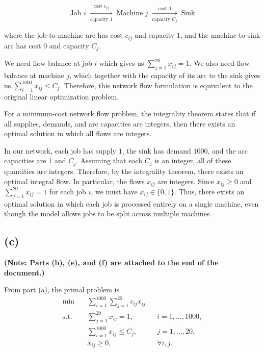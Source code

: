 \documentclass{article}
\begin{document}
\[
\boxed{\text{Job } i}
\;\xrightarrow[\text{capacity }1]{\text{cost }c_{ij}}\;
\boxed{\text{Machine } j}
\;\xrightarrow[\text{capacity }C_j]{\text{cost }0}\;
\boxed{\text{Sink}}
\]

where the job-to-machine arc has cost \(c_{ij}\) and capacity \(1\), and
the machine-to-sink arc has cost \(0\) and capacity \(C_j\).

We need flow balance at job \(i\) which gives us 
$
\sum_{j=1}^{20} x_{ij} = 1.
$
We also need flow balance at machine \(j\), which together with the capacity of its arc to
the sink gives us $
\sum_{i=1}^{1000} x_{ij} \leq C_j.
$ Therefore, this network flow formulation is equivalent to the original
linear optimization problem.


\vspace{3mm}
For a minimum-cost network flow problem, the integrality theorem states
that if all supplies, demands, and arc capacities are integers, then
there exists an optimal solution in which all flows are integers.

In our network, each job has supply $1$, the sink has demand $1000$,
and the arc capacities are $1$ and $C_j$. Assuming that each $C_j$ is
an integer, all of these quantities are integers. Therefore, by the
integrality theorem, there exists an optimal integral flow. In particular, the flows $x_{ij}$ are integers. Since
$
x_{ij} \geq 0
$
and
$\sum_{j=1}^{20} x_{ij} = 1
$
for each job $i$, we must have
$
x_{ij} \in \{0,1\}.
$ Thus, there exists an optimal solution in which each job is processed
entirely on a single machine, even though the model allows jobs to be
split across multiple machines.

\newpage

\subsection*{(c)}

\textbf{(Note: Parts (b), (e), and (f) are attached to the end of the document.)
}


From part (a), the primal problem is
\[
\begin{aligned}
\min \quad &
\sum_{i=1}^{1000}\sum_{j=1}^{20} c_{ij}x_{ij}\\
\text{s.t.}\quad
&\sum_{j=1}^{20}x_{ij}=1,
&& i=1,\ldots,1000,\\
&\sum_{i=1}^{1000}x_{ij}\leq C_j,
&& j=1,\ldots,20,\\
&x_{ij}\geq0,
&& \forall i,j.
\end{aligned}
\]
\end{document}
